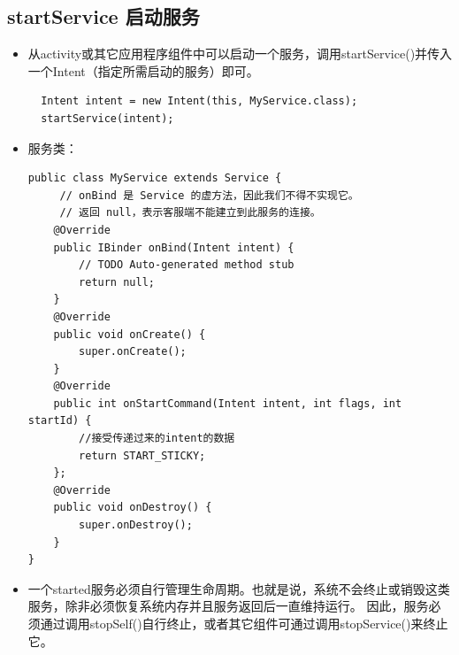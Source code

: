 \documentclass[9pt, b5paper]{article}
\begin{document}
\subsection{startService 启动服务}
\label{sec-3-6}
\begin{itemize}
\item 从activity或其它应用程序组件中可以启动一个服务，调用startService()并传入一个Intent（指定所需启动的服务）即可。
\begin{verbatim}
  Intent intent = new Intent(this, MyService.class);
  startService(intent);
\end{verbatim}
\item 服务类：
\begin{verbatim}
public class MyService extends Service {
     // onBind 是 Service 的虚方法，因此我们不得不实现它。
     // 返回 null，表示客服端不能建立到此服务的连接。
    @Override
    public IBinder onBind(Intent intent) {
        // TODO Auto-generated method stub
        return null;
    }
    @Override
    public void onCreate() {
        super.onCreate();
    }
    @Override
    public int onStartCommand(Intent intent, int flags, int startId) {
        //接受传递过来的intent的数据 
        return START_STICKY; 
    };
    @Override
    public void onDestroy() {
        super.onDestroy();
    }
}
\end{verbatim}
\item 一个started服务必须自行管理生命周期。也就是说，系统不会终止或销毁这类服务，除非必须恢复系统内存并且服务返回后一直维持运行。 因此，服务必须通过调用stopSelf()自行终止，或者其它组件可通过调用stopService()来终止它。
\end{itemize}
\end{document}
